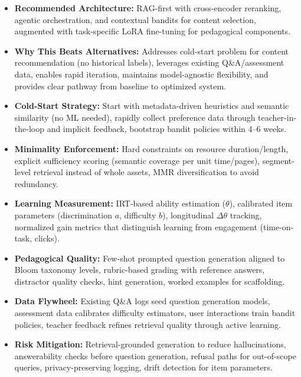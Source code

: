 \documentclass[11pt,letterpaper]{article}
\begin{document}
\begin{itemize}[leftmargin=*]
\item \textbf{Recommended Architecture:} RAG-first with cross-encoder reranking, agentic orchestration, and contextual bandits for content selection, augmented with task-specific LoRA fine-tuning for pedagogical components.

\item \textbf{Why This Beats Alternatives:} Addresses cold-start problem for content recommendation (no historical labels), leverages existing Q\&A/assessment data, enables rapid iteration, maintains model-agnostic flexibility, and provides clear pathway from baseline to optimized system.

\item \textbf{Cold-Start Strategy:} Start with metadata-driven heuristics and semantic similarity (no ML needed), rapidly collect preference data through teacher-in-the-loop and implicit feedback, bootstrap bandit policies within 4--6 weeks.

\item \textbf{Minimality Enforcement:} Hard constraints on resource duration/length, explicit sufficiency scoring (semantic coverage per unit time/pages), segment-level retrieval instead of whole assets, MMR diversification to avoid redundancy.

\item \textbf{Learning Measurement:} IRT-based ability estimation ($\theta$), calibrated item parameters (discrimination $a$, difficulty $b$), longitudinal $\Delta\theta$ tracking, normalized gain metrics that distinguish learning from engagement (time-on-task, clicks).

\item \textbf{Pedagogical Quality:} Few-shot prompted question generation aligned to Bloom taxonomy levels, rubric-based grading with reference answers, distractor quality checks, hint generation, worked examples for scaffolding.

\item \textbf{Data Flywheel:} Existing Q\&A logs seed question generation models, assessment data calibrates difficulty estimators, user interactions train bandit policies, teacher feedback refines retrieval quality through active learning.

\item \textbf{Risk Mitigation:} Retrieval-grounded generation to reduce hallucinations, answerability checks before question generation, refusal paths for out-of-scope queries, privacy-preserving logging, drift detection for item parameters.


\end{itemize}
\end{document}
